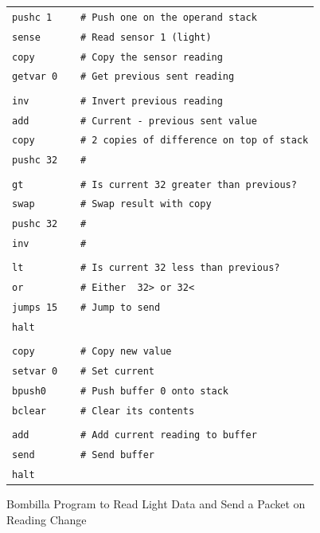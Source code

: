 \documentclass[10pt]{article}
\newcommand{\bomb}{Bombilla\xspace}
\begin{document}
\begin{figure}
\begin{center}
\scriptsize
\begin{tabular}{l}
\verb;pushc 1     # Push one on the operand stack;\\
\verb;sense       # Read sensor 1 (light);\\
\verb;copy        # Copy the sensor reading;\\
\verb;getvar 0    # Get previous sent reading;\\
\verb;;\\
\verb;inv         # Invert previous reading ;\\
\verb;add         # Current - previous sent value;\\
\verb;copy        # 2 copies of difference on top of stack;\\
\verb;pushc 32    #;\\
\verb;;\\
\verb;gt          # Is current 32 greater than previous?;\\
\verb;swap        # Swap result with copy ;\\
\verb;pushc 32    #;\\
\verb;inv         #;\\
\verb;;\\
\verb;lt          # Is current 32 less than previous?;\\
\verb;or          # Either  32> or 32<;\\
\verb;jumps 15    # Jump to send;\\
\verb;halt;\\
\verb;;\\
\verb;copy        # Copy new value;\\
\verb;setvar 0    # Set current;\\
\verb;bpush0      # Push buffer 0 onto stack;\\
\verb;bclear      # Clear its contents;\\
\verb;;\\
\verb;add         # Add current reading to buffer;\\
\verb;send        # Send buffer;\\
\verb;halt;\\

\end{tabular}
\normalsize

\caption{\bomb Program to Read Light Data and Send a Packet on Reading Change}

\label{fig:sense}
\end{center}
\end{figure}
\end{document}
